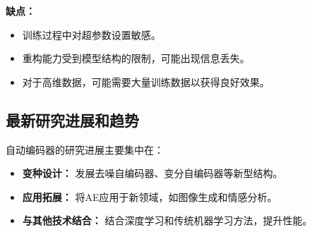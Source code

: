 \textbf{缺点：}
\begin{itemize}
    \item 训练过程中对超参数设置敏感。
    \item 重构能力受到模型结构的限制，可能出现信息丢失。
    \item 对于高维数据，可能需要大量训练数据以获得良好效果。
\end{itemize}

\subsection*{最新研究进展和趋势}
自动编码器的研究进展主要集中在：
\begin{itemize}
    \item \textbf{变种设计：} 发展去噪自编码器、变分自编码器等新型结构。
    \item \textbf{应用拓展：} 将AE应用于新领域，如图像生成和情感分析。
    \item \textbf{与其他技术结合：} 结合深度学习和传统机器学习方法，提升性能。
\end{itemize}
